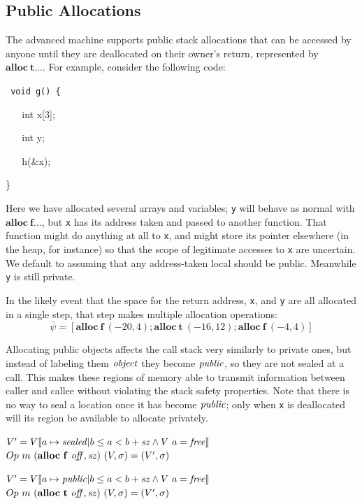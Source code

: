 \documentclass[10pt,conference]{ieeetran}%
\theoremstyle{definition}
\begin{document}
\subsection{Public Allocations}

The advanced machine supports public stack allocations that can
be accessed by anyone until they are deallocated on their owner's return,
represented by \(\mathbf{alloc} ~ \mathbf{t} \dots\).
For example, consider the following code:

{\tt
  void g() \{

  ~ ~ int x[3];

  ~ ~ int y;

  ~ ~ h(\&x);
    
  \}
}

Here we have allocated several arrays and variables; {\tt y}
will behave as normal with \(\mathbf{alloc} ~ \mathbf{f} \dots\), but
{\tt x} has its address taken and passed to another function. That
function might do anything at all to {\tt x}, and might store its pointer
elsewhere (in the heap, for instance) so that the scope of legitimate accesses
to {\tt x} are uncertain. We default to assuming that any address-taken local
should be public. Meanwhile {\tt y} is still private.

In the likely event that the space for the return address, {\tt x}, and {\tt y}
are all allocated in a single step, that step makes multiple allocation operations:
\[\bar{\psi} = [\mathbf{alloc} ~ \mathbf{f} ~ (-20,4);
 \mathbf{alloc} ~ \mathbf{t} ~ (-16,12) ; \mathbf{alloc} ~ \mathbf{f} ~ (-4,4)]\]

Allocating public objects affects the call stack very similarly to private ones,
but instead of labeling them \(\mathit{object}\) they become \(\mathit{public}\), so they are
not sealed at a call. This makes these
regions of memory able to transmit information between caller and callee without
violating the stack safety properties. Note that there is no way to seal a location
once it has become \(\mathit{public}\); only when {\tt x} is deallocated will its region
be available to allocate privately.

           {\(V' = V \llbracket a \mapsto \mathit{sealed} |
             b \leq a < b+\mathit{sz} \land V ~ a = \mathit{free} \rrbracket\)}
           {\(Op ~ m ~ (\mathbf{alloc} ~ \mathbf{f} ~ \mathit{off, sz}) ~ (V,\sigma) = (V',\sigma)\)}

           {\(V' = V \llbracket a \mapsto \mathit{public} |
             b \leq a < b+\mathit{sz} \land V ~ a = \mathit{free} \rrbracket\)}
           {\(Op ~ m ~ (\mathbf{alloc} ~ \mathbf{t} ~ \mathit{off, sz}) ~ (V,\sigma) = (V',\sigma)\)}
\end{document}
